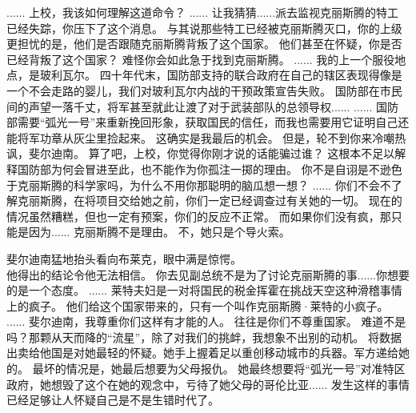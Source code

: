 \documentclass[openany]{book}
\begin{document}
\begin{dialogue}
     ......
     上校，我该如何理解这道命令？
     ......
     让我猜猜......派去监视克丽斯腾的特工已经失踪，你压下了这个消息。
     与其说那些特工已经被克丽斯腾灭口，你的上级更担忧的是，他们是否跟随克丽斯腾背叛了这个国家。
     他们甚至在怀疑，你是否已经背叛了这个国家？
     难怪你会如此急于找到克丽斯腾。
     ......
     我的上一个服役地点，是玻利瓦尔。
     四十年代末，国防部支持的联合政府在自己的辖区表现得像是一个不会走路的婴儿，我们对玻利瓦尔内战的干预政策宣告失败。
     国防部在市民间的声望一落千丈，将军甚至就此让渡了对于武装部队的总领导权......
     ......
     国防部需要“弧光一号”来重新挽回形象，获取国民的信任，而我也需要用它证明自己还能将军功章从灰尘里捡起来。
     这确实是我最后的机会。
     但是，轮不到你来冷嘲热讽，斐尔迪南。
     算了吧，上校，你觉得你刚才说的话能骗过谁？
     这根本不足以解释国防部为何会冒进至此，也不能作为你孤注一掷的理由。
     你不是自诩是不逊色于克丽斯腾的科学家吗，为什么不用你那聪明的脑瓜想一想？
     ......
     你们不会不了解克丽斯腾，在将项目交给她之前，你们一定已经调查过有关她的一切。
     现在的情况虽然糟糕，但也一定有预案，你们的反应不正常。
     而如果你们没有疯，那只能是因为......
     克丽斯腾不是理由。
     不，她只是个导火索。\par
    斐尔迪南猛地抬头看向布莱克，眼中满是惊愕。\\
    他得出的结论令他无法相信。
     你去见副总统不是为了讨论克丽斯腾的事......你想要的是一个态度。
     ......
     莱特夫妇是一对将国民的税金挥霍在挑战天空这种滑稽事情上的疯子。
     他们给这个国家带来的，只有一个叫作克丽斯腾·莱特的小疯子。
     ......
     斐尔迪南，我尊重你们这样有才能的人。
     往往是你们不尊重国家。
     难道不是吗？那颗从天而降的“流星”，除了对我们的挑衅，我想象不出别的动机。
     将数据出卖给他国是对她最轻的怀疑。她手上握着足以重创移动城市的兵器。军方递给她的。
     最坏的情况是，她最后想要为父母报仇。
     她最终想要将“弧光一号”对准特区政府，她想毁了这个在她的观念中，亏待了她父母的哥伦比亚......
     发生这样的事情已经足够让人怀疑自己是不是生错时代了。

\end{dialogue}
\end{document}
